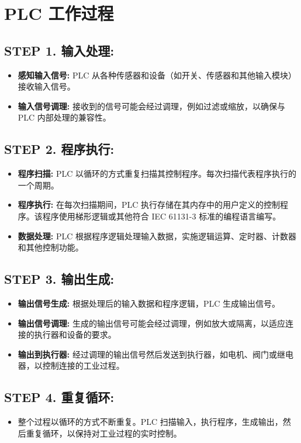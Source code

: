 \documentclass{book}
\begin{document}
\section*{PLC 工作过程}

\subsection*{STEP 1. 输入处理:}
\begin{itemize}
	\item \textbf{感知输入信号:} PLC 从各种传感器和设备（如开关、传感器和其他输入模块）接收输入信号。
	\item \textbf{输入信号调理:} 接收到的信号可能会经过调理，例如过滤或缩放，以确保与 PLC 内部处理的兼容性。
\end{itemize}

\subsection*{STEP 2. 程序执行:}
\begin{itemize}
	\item \textbf{程序扫描:} PLC 以循环的方式重复扫描其控制程序。每次扫描代表程序执行的一个周期。
	\item \textbf{程序执行:} 在每次扫描期间，PLC 执行存储在其内存中的用户定义的控制程序。该程序使用梯形逻辑或其他符合 IEC 61131-3 标准的编程语言编写。
	\item \textbf{数据处理:} PLC 根据程序逻辑处理输入数据，实施逻辑运算、定时器、计数器和其他控制功能。
\end{itemize}

\subsection*{STEP 3. 输出生成:}
\begin{itemize}
	\item \textbf{输出信号生成:} 根据处理后的输入数据和程序逻辑，PLC 生成输出信号。
	\item \textbf{输出信号调理:} 生成的输出信号可能会经过调理，例如放大或隔离，以适应连接的执行器和设备的要求。
	\item \textbf{输出到执行器:} 经过调理的输出信号然后发送到执行器，如电机、阀门或继电器，以控制连接的工业过程。
\end{itemize}

\subsection*{STEP 4. 重复循环:}
\begin{itemize}
	\item 整个过程以循环的方式不断重复。PLC 扫描输入，执行程序，生成输出，然后重复循环，以保持对工业过程的实时控制。
\end{itemize}
\end{document}
